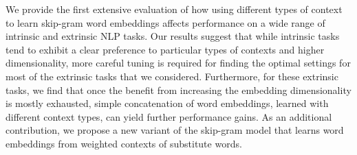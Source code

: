 We provide the first extensive evaluation of how using different types of context to learn skip-gram word embeddings affects performance on a wide range of intrinsic and extrinsic NLP tasks. Our results suggest that while intrinsic tasks tend to exhibit a clear preference to particular types of contexts and higher dimensionality, more careful tuning is required for finding the optimal settings for most of the extrinsic tasks that we considered. Furthermore, for these extrinsic tasks, we find that once the benefit from increasing the embedding dimensionality is mostly exhausted, simple concatenation of word embeddings, learned with different context types, can yield further performance gains. As an additional contribution, we propose a new variant of the skip-gram model that learns word embeddings from weighted contexts of substitute words.
